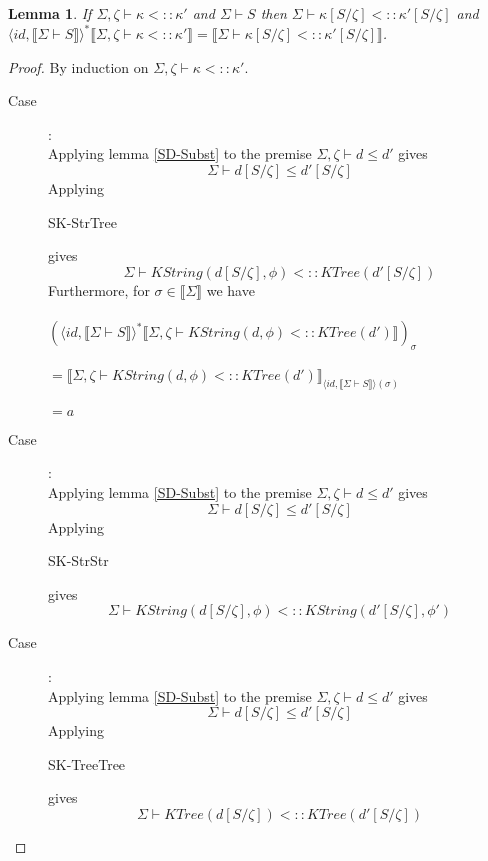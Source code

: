 \documentclass{article}
\newtheorem{lemma}{Lemma}
\newcommand{\sem}[1]{\llbracket #1 \rrbracket}
\begin{document}
\begin{lemma}
If $\Sigma,\zeta \vdash \kappa <:: \kappa'$ and $\Sigma \vdash S$ then $\Sigma \vdash \kappa[S/\zeta] <:: \kappa'[S/\zeta]$ and $\langle \mathit{id}, \sem{\Sigma \vdash S} \rangle^*\sem{\Sigma,\zeta \vdash \kappa <:: \kappa'} = \sem{\Sigma \vdash \kappa[S/\zeta] <:: \kappa'[S/\zeta]}$.
\label{SK-Subst}
\end{lemma}

\begin{proof}
By induction on $\Sigma,\zeta \vdash \kappa <:: \kappa'$.

\begin{description}
\item[Case \begin{sc}SK-StrTree\end{sc}]:~\\
Applying lemma \ref{SD-Subst} to the premise $\Sigma,\zeta \vdash d \leq d'$ gives $$\Sigma \vdash d[S/\zeta] \leq d'[S/\zeta]$$ Applying \begin{sc}SK-StrTree\end{sc} gives $$\Sigma \vdash \mathit{KString(d[S/\zeta],\phi) <:: \mathit{KTree}(d'[S/\zeta])}$$
Furthermore, for $\sigma \in \sem{\Sigma}$ we have\\~\\
$(\langle \mathit{id}, \sem{\Sigma \vdash S} \rangle^* \sem{\Sigma,\zeta \vdash \mathit{KString}(d,\phi) <:: KTree(d')})_\sigma $\\~\\
$= \sem{\Sigma,\zeta \vdash \mathit{KString}(d,\phi) <:: KTree(d')}_{\langle \mathit{id}, \sem{\Sigma \vdash S} \rangle(\sigma)}$\\~\\
$= a$

\item[Case \begin{sc}SK-StrStr\end{sc}]:~\\
Applying lemma \ref{SD-Subst} to the premise $\Sigma,\zeta \vdash d \leq d'$ gives $$\Sigma \vdash d[S/\zeta] \leq d'[S/\zeta]$$ Applying \begin{sc}SK-StrStr\end{sc} gives $$\Sigma \vdash \mathit{KString}(d[S/\zeta],\phi) <:: \mathit{KString}(d'[S/\zeta], \phi')$$
\item[Case \begin{sc}SK-TreeTree\end{sc}]:~\\
Applying lemma \ref{SD-Subst} to the premise $\Sigma,\zeta \vdash d \leq d'$ gives $$\Sigma \vdash d[S/\zeta] \leq d'[S/\zeta]$$ Applying \begin{sc}SK-TreeTree\end{sc} gives $$\Sigma \vdash \mathit{KTree}(d[S/\zeta]) <:: \mathit{KTree}(d'[S/\zeta])$$
\end{description}
\end{proof}
\end{document}
